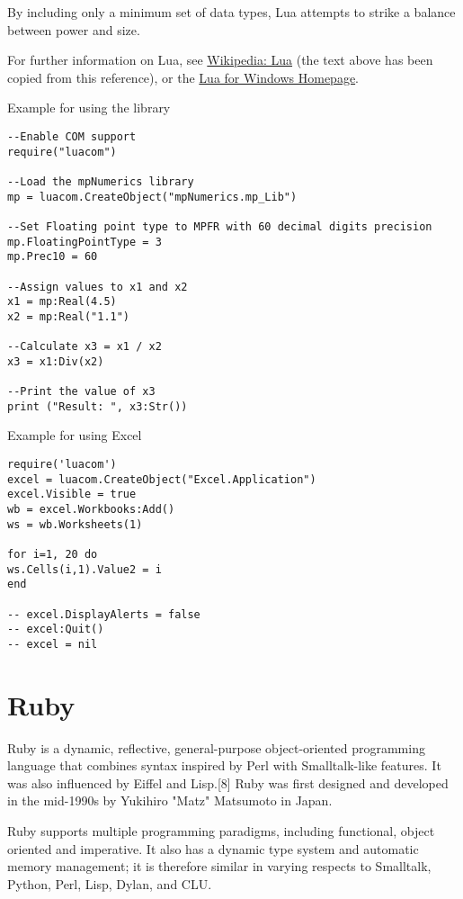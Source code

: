 \vpara
By including only a minimum set of data types, Lua attempts to strike a balance between power and size.

For further information on Lua, see \href{http://en.wikipedia.org/wiki/Lua_(programming_language)}{Wikipedia: Lua} (the text above has been copied from this reference), or the  \href{http://code.google.com/p/luaforwindows/}{Lua for Windows Homepage}.


\vpara
Example for using the library

\begin{lstlisting}
--Enable COM support
require("luacom")

--Load the mpNumerics library
mp = luacom.CreateObject("mpNumerics.mp_Lib")

--Set Floating point type to MPFR with 60 decimal digits precision
mp.FloatingPointType = 3
mp.Prec10 = 60

--Assign values to x1 and x2
x1 = mp:Real(4.5)
x2 = mp:Real("1.1")

--Calculate x3 = x1 / x2
x3 = x1:Div(x2)

--Print the value of x3
print ("Result: ", x3:Str())
\end{lstlisting}


\vpara
Example for using Excel

\begin{lstlisting}
require('luacom')
excel = luacom.CreateObject("Excel.Application")
excel.Visible = true
wb = excel.Workbooks:Add()
ws = wb.Worksheets(1)

for i=1, 20 do
ws.Cells(i,1).Value2 = i
end

-- excel.DisplayAlerts = false
-- excel:Quit()
-- excel = nil
\end{lstlisting}



\newpage
\section{Ruby}
Ruby is a dynamic, reflective, general-purpose object-oriented programming language that combines syntax inspired by Perl with Smalltalk-like features. It was also influenced by Eiffel and Lisp.[8] Ruby was first designed and developed in the mid-1990s by Yukihiro "Matz" Matsumoto in Japan.

\vpara
Ruby supports multiple programming paradigms, including functional, object oriented and imperative. It also has a dynamic type system and automatic memory management; it is therefore similar in varying respects to Smalltalk, Python, Perl, Lisp, Dylan, and CLU.

